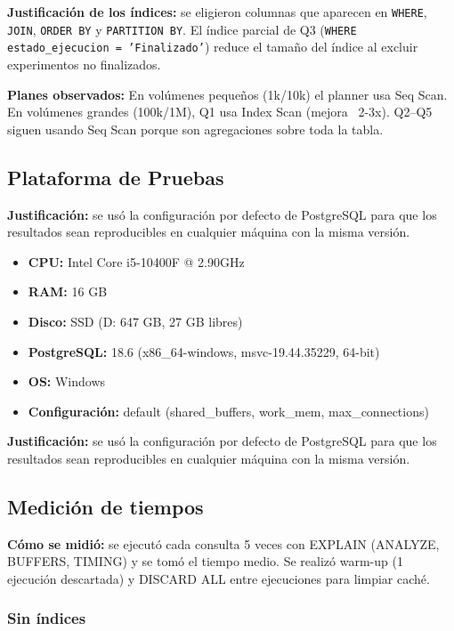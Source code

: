 \documentclass[12pt,a4paper]{article}
\begin{document}
\textbf{Justificación de los índices:} se eligieron columnas que aparecen en \texttt{WHERE}, \texttt{JOIN}, \texttt{ORDER BY} y \texttt{PARTITION BY}. El índice parcial de Q3 (\texttt{WHERE estado\_ejecucion = 'Finalizado'}) reduce el tamaño del índice al excluir experimentos no finalizados.

\textbf{Planes observados:} En volúmenes pequeños (1k/10k) el planner usa Seq Scan. En volúmenes grandes (100k/1M), Q1 usa Index Scan (mejora ~2-3x). Q2–Q5 siguen usando Seq Scan porque son agregaciones sobre toda la tabla.

\subsection{Plataforma de Pruebas}

\textbf{Justificación:} se usó la configuración por defecto de PostgreSQL para que los resultados sean reproducibles en cualquier máquina con la misma versión.

\begin{itemize}
  \item \textbf{CPU:} Intel Core i5-10400F @ 2.90GHz
  \item \textbf{RAM:} 16 GB
  \item \textbf{Disco:} SSD (D: 647 GB, 27 GB libres)
  \item \textbf{PostgreSQL:} 18.6 (x86\_64-windows, msvc-19.44.35229, 64-bit)
  \item \textbf{OS:} Windows
  \item \textbf{Configuración:} default (shared\_buffers, work\_mem, max\_connections)
\end{itemize}

\textbf{Justificación:} se usó la configuración por defecto de PostgreSQL para que los resultados sean reproducibles en cualquier máquina con la misma versión.

\subsection{Medición de tiempos}

\textbf{Cómo se midió:} se ejecutó cada consulta 5 veces con EXPLAIN (ANALYZE, BUFFERS, TIMING) y se tomó el tiempo medio. Se realizó warm-up (1 ejecución descartada) y DISCARD ALL entre ejecuciones para limpiar caché.

\subsubsection{Sin índices}
\end{document}
